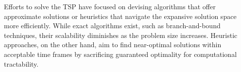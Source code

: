 Efforts to solve the TSP have focused on devising algorithms that offer approximate solutions or heuristics that navigate the expansive solution space more efficiently.
While exact algorithms exist, such as branch-and-bound techniques, their scalability diminishes as the problem size increases.
Heuristic approaches, on the other hand, aim to find near-optimal solutions within acceptable time frames by sacrificing guaranteed optimality for computational tractability.

